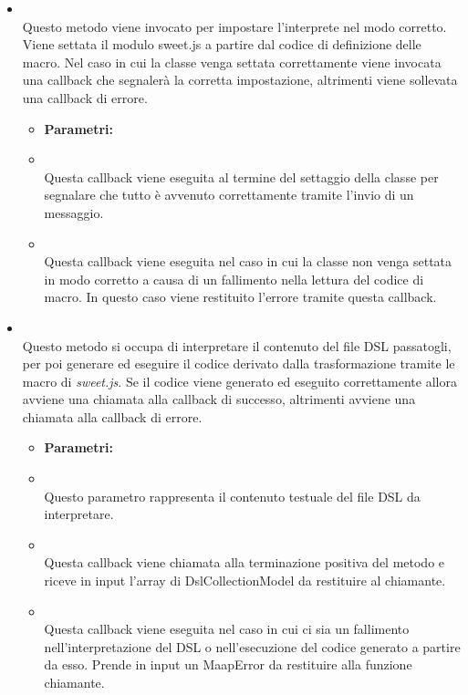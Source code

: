 \begin{itemize}
\item[] \textbf{} \\ Questo metodo viene invocato per impostare l'interprete nel modo corretto. Viene settata il modulo sweet.js a partire dal codice di definizione delle macro. Nel caso in cui la classe venga settata correttamente viene invocata una callback che segnalerà la corretta impostazione, altrimenti viene sollevata una callback di errore.
\begin{itemize}\addtolength{\itemsep}{-0.5\baselineskip}
\item[] \textbf{Parametri:}
\item[]  \\ Questa callback viene eseguita al termine del settaggio della classe per segnalare che tutto è avvenuto correttamente tramite l'invio di un messaggio.
\item[]  \\ Questa callback viene eseguita nel caso in cui la classe non venga settata in modo corretto a causa di un fallimento nella lettura del codice di macro. In questo caso viene restituito l'errore tramite questa callback.
\end{itemize}
\item[] \textbf{} \\ Questo metodo si occupa di interpretare il contenuto del file DSL passatogli, per poi generare ed eseguire il codice derivato dalla trasformazione tramite le macro di \textit{sweet.js}. Se il codice viene generato ed eseguito correttamente allora avviene una chiamata alla callback di successo, altrimenti avviene una chiamata alla callback di errore.
\begin{itemize}\addtolength{\itemsep}{-0.5\baselineskip}
\item[] \textbf{Parametri:}
\item[]  \\ Questo parametro rappresenta il contenuto testuale del file DSL da interpretare.
\item[]  \\ Questa callback viene chiamata alla terminazione positiva del metodo e riceve in input l'array di DslCollectionModel da restituire al chiamante.
\item[]  \\ Questa callback viene eseguita nel caso in cui ci sia un fallimento nell'interpretazione del DSL o nell'esecuzione del codice generato a partire da esso. Prende in input un MaapError da restituire alla funzione chiamante.
\end{itemize}
\end{itemize}

